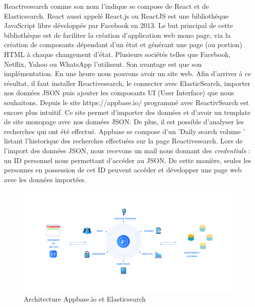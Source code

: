 Reactivesearch comme son nom l’indique se compose de React et de Elasticsearch.
React aussi appelé React.js ou ReactJS est une bibliothèque JavaScript libre développée par Facebook en 2013.
Le but principal de cette bibliothèque est de faciliter la création d’application web mono page, via la création de composants dépendant d'un état et générant une page (ou portion) HTML à chaque changement d'état.
Plusieurs sociétés telles que Facebook, Netflix, Yahoo ou WhatsApp l’utilisent. Son avantage est que son implémentation.
En une heure nous pouvons avoir un site web. Afin d’arriver à ce résultat, il faut installer Reactivesearch, le connecter avec ElasticSearch, importer nos données JSON puis ajouter les composants UI (User Interface) que nous souhaitons. 
Depuis le site https://appbase.io/ programmé avec ReactivSearch est encore plus intuitif. Ce site permet d’importer des données et d’avoir un template de site monopage avec nos données JSON.
De plus, il est possible d’analyser les recherches qui ont été effectué.
Appbase se compose d’un 'Daily search volume ' listant l’historique des recherches effectuées sur la page Reactivesearch. 
Lors de l’import des données JSON, nous recevons un mail nous donnant des \textit{credentials} : un ID personnel nous permettant d’accéder au JSON.
De cette manière, seules les personnes en possession de cet ID peuvent accéder et développer une page web avec les données importées. 

\begin{figure}[h!]
  \centering
  \includegraphics[width=\textwidth]{images/ArchitectureElasticsearchAppbase.png}
	\caption[]{Architecture Appbase.io et Elasticsearch}
  \label{}
\end{figure}

